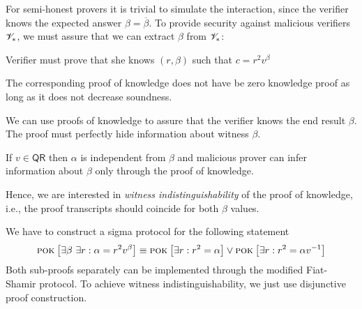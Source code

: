 \documentclass[landscape,dvips,footrule]{foils}
\begin{document}



For semi-honest provers it is trivial to simulate the interaction,
since the verifier knows the expected answer
$\beta=\overline{\beta}$. To provide security against malicious
verifiers $\mathscr{V}_*$, we must assure that we can extract
$\beta$ from $\mathscr{V}_*$:
\begin{triangles}
  \item Verifier must prove that she knows $(r,\beta)$ such that $c=r^2v^{\beta}$ 
  \item The corresponding proof of knowledge does not have be zero
    knowledge proof as long as it does not decrease soundness.
\end{triangles}



We can use proofs of knowledge to assure that the verifier knows the
end result $\beta$. The proof must perfectly hide  information about witness
$\beta$.
\begin{triangles}
\item If $v\in\mathsf{QR}$ then $\alpha$ is independent from $\beta$
  and malicious prover can infer information about $\beta$ only
  through the proof of knowledge.
\item Hence, we are interested in \emph{witness indistinguishability}
  of the proof of knowledge, i.e., the proof transcripts should
  coincide for both $\beta$ values.
\end{triangles}


We have to construct a sigma protocol for the following statement
\begin{align*}
\textsc{pok}_{}\left[\exists \beta\ \exists r: \alpha=r^2v^\beta\right]\equiv
\textsc{pok}_{}\left[\exists r:r^2=\alpha\right]\vee \textsc{pok}_{}\left[\exists r:r^2=\alpha v^{-1}\right]  
\end{align*}
Both sub-proofs separately can be implemented through the modified
Fiat-Shamir protocol. To achieve witness indistinguishability, we just
use disjunctive proof construction.
\end{document}
